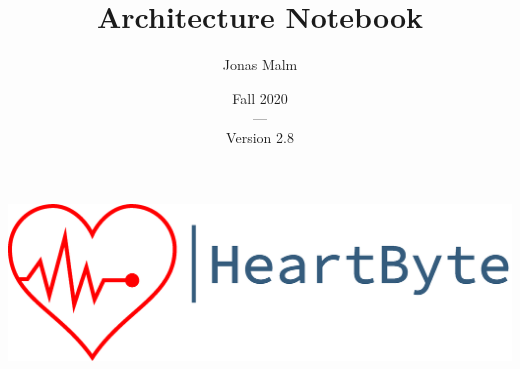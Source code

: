 \documentclass{article}
\title{Architecture Notebook}
\author{Jonas Malm}
\date{Fall 2020\\---\\Version 2.8}
\begin{document}
\maketitle

\begin{centering}
\includegraphics[scale=0.7]{logo-heartbyte}
\end{centering}

\clearpage
\end{document}
